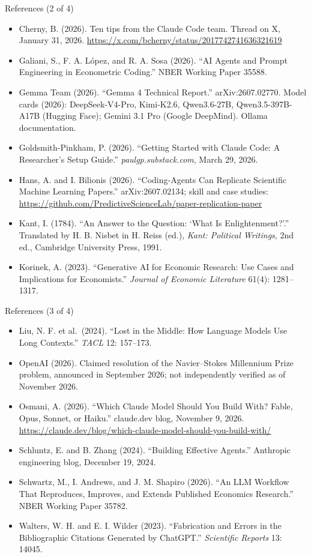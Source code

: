 \documentclass[aspectratio=169,10pt]{beamer}
\begin{document}
\begin{frame}{References (2 of 4)}
\footnotesize
\begin{itemize}\itemsep3pt
  \item Cherny, B. (2026). Ten tips from the Claude Code team. Thread on X, January 31, 2026. \url{https://x.com/bcherny/status/2017742741636321619}
  \item Galiani, S., F. A. L\'opez, and R. A. Sosa (2026). ``AI Agents and Prompt Engineering in Econometric Coding.'' NBER Working Paper 35588.
  \item Gemma Team (2026). ``Gemma 4 Technical Report.'' arXiv:2607.02770. Model cards (2026): DeepSeek-V4-Pro, Kimi-K2.6, Qwen3.6-27B, Qwen3.5-397B-A17B (Hugging Face); Gemini 3.1 Pro (Google DeepMind). Ollama documentation.
  \item Goldsmith-Pinkham, P. (2026). ``Getting Started with Claude Code: A Researcher's Setup Guide.'' \emph{paulgp.substack.com}, March 29, 2026.
  \item Hans, A. and I. Bilionis (2026). ``Coding-Agents Can Replicate Scientific Machine Learning Papers.'' arXiv:2607.02134; skill and case studies: \url{https://github.com/PredictiveScienceLab/paper-replication-paper}
  \item Kant, I. (1784). ``An Answer to the Question: `What Is Enlightenment?'.'' Translated by H. B. Nisbet in H. Reiss (ed.), \emph{Kant: Political Writings}, 2nd ed., Cambridge University Press, 1991.
  \item Korinek, A. (2023). ``Generative AI for Economic Research: Use Cases and Implications for Economists.'' \emph{Journal of Economic Literature} 61(4): 1281--1317.
\end{itemize}
\end{frame}

\begin{frame}{References (3 of 4)}
\footnotesize
\begin{itemize}\itemsep3pt
  \item Liu, N. F. et al.\ (2024). ``Lost in the Middle: How Language Models Use Long Contexts.'' \emph{TACL} 12: 157--173.
  \item OpenAI (2026). Claimed resolution of the Navier--Stokes Millennium Prize problem, announced in September 2026; not independently verified as of November 2026.
  \item Osmani, A. (2026). ``Which Claude Model Should You Build With? Fable, Opus, Sonnet, or Haiku.'' claude.dev blog, November 9, 2026. \url{https://claude.dev/blog/which-claude-model-should-you-build-with/}
  \item Schluntz, E. and B. Zhang (2024). ``Building Effective Agents.'' Anthropic engineering blog, December 19, 2024.
  \item Schwartz, M., I. Andrews, and J. M. Shapiro (2026). ``An LLM Workflow That Reproduces, Improves, and Extends Published Economics Research.'' NBER Working Paper 35782.
  \item Walters, W. H. and E. I. Wilder (2023). ``Fabrication and Errors in the Bibliographic Citations Generated by ChatGPT.'' \emph{Scientific Reports} 13: 14045.
\end{itemize}
\end{frame}
\end{document}
